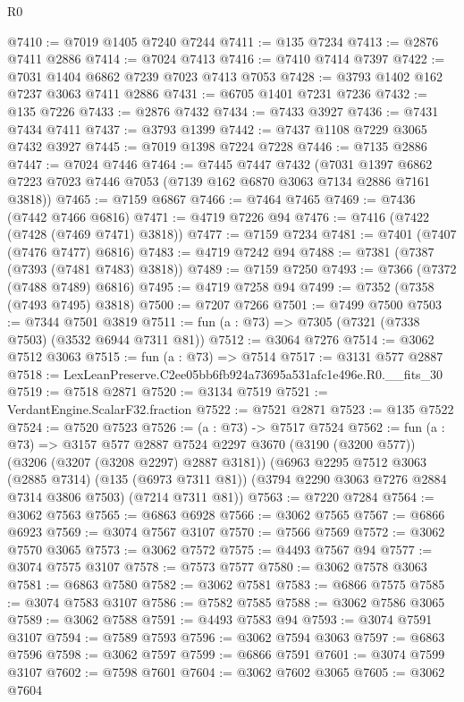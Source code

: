 \begin{lexlean}{R0}
\begin{coremodule}
@7410 := @7019 @1405 @7240 @7244
@7411 := @135 @7234
@7413 := @2876 @7411 @2886
@7414 := @7024 @7413
@7416 := @7410 @7414 @7397
@7422 := @7031 @1404 @6862 @7239 @7023 @7413 @7053
@7428 := @3793 @1402 @162 @7237 @3063 @7411 @2886
@7431 := @6705 @1401 @7231 @7236
@7432 := @135 @7226
@7433 := @2876 @7432
@7434 := @7433 @3927
@7436 := @7431 @7434 @7411
@7437 := @3793 @1399
@7442 := @7437 @1108 @7229 @3065 @7432 @3927
@7445 := @7019 @1398 @7224 @7228
@7446 := @7135 @2886
@7447 := @7024 @7446
@7464 := @7445
    @7447
    @7432
    (@7031 @1397 @6862 @7223 @7023 @7446 @7053 (@7139 @162 @6870 @3063 @7134 @2886 @7161 @3818))
@7465 := @7159 @6867
@7466 := @7464 @7465
@7469 := @7436 (@7442 @7466 @6816)
@7471 := @4719 @7226 @94
@7476 := @7416 (@7422 (@7428 (@7469 @7471) @3818))
@7477 := @7159 @7234
@7481 := @7401 (@7407 (@7476 @7477) @6816)
@7483 := @4719 @7242 @94
@7488 := @7381 (@7387 (@7393 (@7481 @7483) @3818))
@7489 := @7159 @7250
@7493 := @7366 (@7372 (@7488 @7489) @6816)
@7495 := @4719 @7258 @94
@7499 := @7352 (@7358 (@7493 @7495) @3818)
@7500 := @7207 @7266
@7501 := @7499 @7500
@7503 := @7344 @7501 @3819
@7511 := fun (a : @73) => @7305 (@7321 (@7338 @7503) (@3532 @6944 @7311 @81))
@7512 := @3064 @7276
@7514 := @3062 @7512 @3063
@7515 := fun (a : @73) => @7514
@7517 := @3131 @577 @2887
@7518 := LexLeanPreserve.C2ee05bb6fb924a73695a531afc1e496e.R0.__fits_30
@7519 := @7518 @2871
@7520 := @3134 @7519
@7521 := VerdantEngine.ScalarF32.fraction
@7522 := @7521 @2871
@7523 := @135 @7522
@7524 := @7520 @7523
@7526 := (a : @73) -> @7517 @7524
@7562 := fun (a : @73) =>
  @3157
    @577
    @2887
    @7524
    @2297
    @3670
    (@3190 (@3200 @577))
    (@3206 (@3207 (@3208 @2297) @2887 @3181))
    (@6963
      @2295
      @7512
      @3063
      (@2885 @7314)
      (@135 (@6973 @7311 @81))
      (@3794 @2290 @3063 @7276 @2884 @7314 @3806 @7503)
      (@7214 @7311 @81))
@7563 := @7220 @7284
@7564 := @3062 @7563
@7565 := @6863 @6928
@7566 := @3062 @7565
@7567 := @6866 @6923
@7569 := @3074 @7567 @3107
@7570 := @7566 @7569
@7572 := @3062 @7570 @3065
@7573 := @3062 @7572
@7575 := @4493 @7567 @94
@7577 := @3074 @7575 @3107
@7578 := @7573 @7577
@7580 := @3062 @7578 @3063
@7581 := @6863 @7580
@7582 := @3062 @7581
@7583 := @6866 @7575
@7585 := @3074 @7583 @3107
@7586 := @7582 @7585
@7588 := @3062 @7586 @3065
@7589 := @3062 @7588
@7591 := @4493 @7583 @94
@7593 := @3074 @7591 @3107
@7594 := @7589 @7593
@7596 := @3062 @7594 @3063
@7597 := @6863 @7596
@7598 := @3062 @7597
@7599 := @6866 @7591
@7601 := @3074 @7599 @3107
@7602 := @7598 @7601
@7604 := @3062 @7602 @3065
@7605 := @3062 @7604

\end{coremodule}
\end{lexlean}
